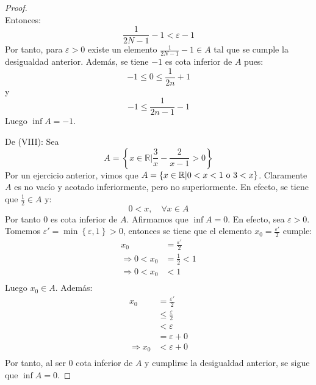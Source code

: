 \documentclass[12pt]{article}
\begin{document}
\begin{enumerate}
\begin{proof}
\begin{equation*}
        \end{equation*}
        Entonces:
        \begin{equation*}
            \frac{1}{2N-1}-1<\varepsilon-1
        \end{equation*}
        Por tanto, para $\varepsilon>0$ existe un elemento $\frac{1}{2N-1}-1\in A$ tal que se cumple la desigualdad anterior. Además, se tiene $-1$ es cota inferior de $A$ pues:
        \begin{equation*}
            -1\leq 0\leq \frac{1}{2n}+1
        \end{equation*}
        y
        \begin{equation*}
            -1\leq \frac{1}{2n-1}-1
        \end{equation*}
        Luego $\inf A = -1$.
        
        De (VIII): Sea
        \begin{equation*}
            A = \left\{x\in\mathbb{R}|\frac{3}{x}-\frac{2}{x-1}>0\right\}
        \end{equation*}
        Por un ejercicio anterior, vimos que $A = \left\{x\in\mathbb{R}|0<x<1 \textup{ o } 3 < x\right\}$. Claramente $A$ es no vacío y acotado inferiormente, pero no superiormente. En efecto, se tiene que $\frac{1}{2}\in A$ y:
        \begin{equation*}
            0< x, \quad \forall x \in A
        \end{equation*}
        Por tanto $0$ es cota inferior de $A$. Afirmamos que $\inf A = 0$. En efecto, sea $\varepsilon > 0$. Tomemos $\varepsilon' = \min \left\{\varepsilon, 1\right\}>0$, entonces se tiene que el elemento $x_0=\frac{\varepsilon'}{2}$ cumple:
        \begin{equation*}
            \begin{split}
                x_0 &= \frac{\varepsilon'}{2}\\
                \Rightarrow 0 < x_0 &= \frac{1}{2} < 1\\
                \Rightarrow 0 < x_0 &< 1\\
            \end{split}
        \end{equation*}
        Luego $x_0\in A$. Además:
        \begin{equation*}
            \begin{split}
                x_0 &= \frac{\varepsilon'}{2}\\
                &\leq \frac{\varepsilon}{2}\\
                &< \varepsilon\\
                &= \varepsilon + 0\\
                \Rightarrow x_0 &< \varepsilon + 0\\
            \end{split}
        \end{equation*}
        Por tanto, al ser $0$ cota inferior de $A$ y cumplirse la desigualdad anterior, se sigue que $\inf A = 0$.


\end{proof}
\end{enumerate}
\end{document}
